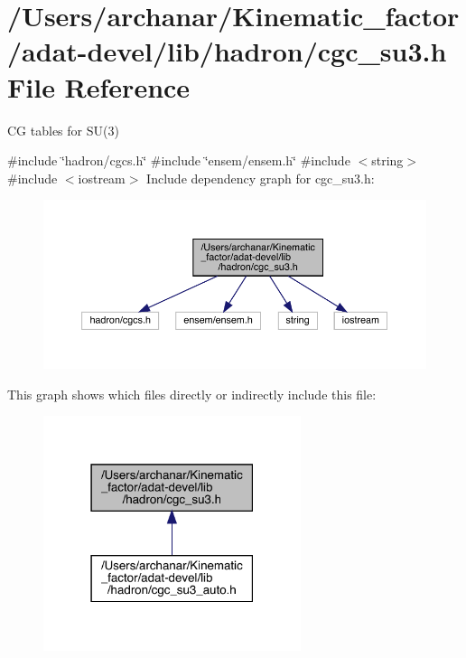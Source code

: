 \hypertarget{adat-devel_2lib_2hadron_2cgc__su3_8h}{}\section{/\+Users/archanar/\+Kinematic\+\_\+factor/adat-\/devel/lib/hadron/cgc\+\_\+su3.h File Reference}
\label{adat-devel_2lib_2hadron_2cgc__su3_8h}


CG tables for S\+U(3)  


{\ttfamily \#include \char`\"{}hadron/cgcs.\+h\char`\"{}}\newline
{\ttfamily \#include \char`\"{}ensem/ensem.\+h\char`\"{}}\newline
{\ttfamily \#include $<$string$>$}\newline
{\ttfamily \#include $<$iostream$>$}\newline
Include dependency graph for cgc\+\_\+su3.\+h\+:
\nopagebreak
\begin{figure}[H]
\begin{center}
\leavevmode
\includegraphics[width=350pt]{d4/d90/adat-devel_2lib_2hadron_2cgc__su3_8h__incl}
\end{center}
\end{figure}
This graph shows which files directly or indirectly include this file\+:
\nopagebreak
\begin{figure}[H]
\begin{center}
\leavevmode
\includegraphics[width=214pt]{da/de9/adat-devel_2lib_2hadron_2cgc__su3_8h__dep__incl}
\end{center}
\end{figure}
